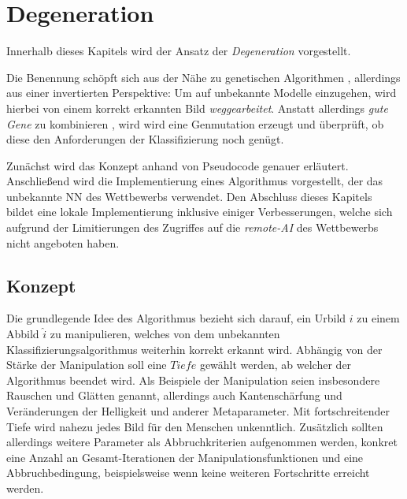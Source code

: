 \chapter{Degeneration}
\label{cha:Degeneration}
Innerhalb dieses Kapitels wird der Ansatz der \textit{Degeneration} vorgestellt.

Die Benennung schöpft sich aus der Nähe zu genetischen Algorithmen \cite{heistermann2013genetische}, allerdings aus einer invertierten Perspektive: Um auf unbekannte Modelle einzugehen, wird hierbei von einem korrekt erkannten Bild \textit{weggearbeitet}. Anstatt allerdings \textit{gute Gene} zu kombinieren \cite{schoneburg1994genetische}, wird wird eine Genmutation erzeugt und überprüft, ob diese den Anforderungen der Klassifizierung noch genügt. 

Zunächst wird das Konzept anhand von Pseudocode genauer erläutert. Anschließend wird die Implementierung eines Algorithmus vorgestellt, der das unbekannte \ac{NN} des Wettbewerbs verwendet. Den Abschluss dieses Kapitels bildet eine lokale Implementierung inklusive einiger Verbesserungen, welche sich aufgrund der Limitierungen des Zugriffes auf die \textit{remote-AI} des Wettbewerbs nicht angeboten haben.
\section{Konzept}
\label{sec:DegenerationKonzept}
Die grundlegende Idee des Algorithmus bezieht sich darauf, ein Urbild $i$ zu einem Abbild $\hat{i}$ zu manipulieren, welches von dem unbekannten Klassifizierungsalgorithmus weiterhin korrekt erkannt wird. Abhängig von der Stärke der Manipulation soll eine $Tiefe$ gewählt werden, ab welcher der Algorithmus beendet wird. Als Beispiele der Manipulation seien insbesondere Rauschen und Glätten genannt, allerdings auch Kantenschärfung und Veränderungen der Helligkeit und anderer Metaparameter. Mit fortschreitender Tiefe wird nahezu jedes Bild für den Menschen unkenntlich. Zusätzlich sollten allerdings weitere Parameter als Abbruchkriterien aufgenommen werden, konkret eine Anzahl an Gesamt-Iterationen der Manipulationsfunktionen und eine Abbruchbedingung, beispielsweise wenn keine weiteren Fortschritte erreicht werden.

\newpage
